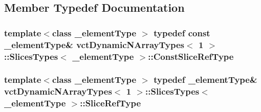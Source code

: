 \subsection{Member Typedef Documentation}
\hypertarget{classvct_dynamic_n_array_types_3_011_01_4_1_1_slices_types_a18f8addeaaa816d30b9ed8a7e7dd8f77}{
\subsubsection[{Const\-Slice\-Ref\-Type}]{\setlength{\rightskip}{0pt plus 5cm}template$<$class \-\_\-element\-Type $>$ typedef const \-\_\-element\-Type\& {\bf vct\-Dynamic\-N\-Array\-Types}$<$ 1 $>$\-::Slices\-Types$<$ \-\_\-element\-Type $>$\-::{\bf Const\-Slice\-Ref\-Type}}}\label{classvct_dynamic_n_array_types_3_011_01_4_1_1_slices_types_a18f8addeaaa816d30b9ed8a7e7dd8f77}
\hypertarget{classvct_dynamic_n_array_types_3_011_01_4_1_1_slices_types_a34c9917853ea79e85ef0924a9a56a60f}{
\subsubsection[{Slice\-Ref\-Type}]{\setlength{\rightskip}{0pt plus 5cm}template$<$class \-\_\-element\-Type $>$ typedef \-\_\-element\-Type\& {\bf vct\-Dynamic\-N\-Array\-Types}$<$ 1 $>$\-::Slices\-Types$<$ \-\_\-element\-Type $>$\-::{\bf Slice\-Ref\-Type}}}\label{classvct_dynamic_n_array_types_3_011_01_4_1_1_slices_types_a34c9917853ea79e85ef0924a9a56a60f}


